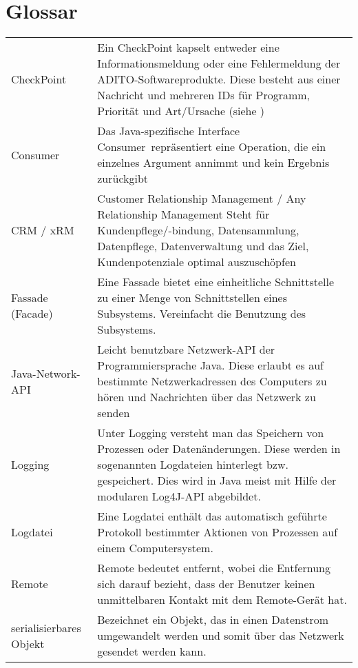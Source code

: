 \section{Glossar}
\begin{center}
	\begin{tabularx}{\textwidth}{p{}|X}
	    CheckPoint  & Ein CheckPoint kapselt entweder eine Informationsmeldung oder eine Fehlermeldung der ADITO-Softwareprodukte. Diese besteht aus einer Nachricht und mehreren IDs für Programm, Priorität und Art/Ursache (siehe \prettyref{sec:IRemoteLoggerCommand}) \\

   	  	Consumer  & Das Java-spezifische Interface \glqq Consumer\grqq\ repräsentiert eine Operation, die ein einzelnes Argument annimmt und kein Ergebnis zurückgibt \\

	    CRM / xRM & 
		Customer Relationship Management / Any Relationship Management
	  	Steht für Kundenpflege/-bindung, Datensammlung, Datenpflege, Datenverwaltung und das Ziel, Kundenpotenziale optimal auszuschöpfen \\ 
	  	
	  	Fassade (Facade) & Eine Fassade bietet eine einheitliche Schnittstelle zu einer Menge von Schnittstellen eines Subsystems. Vereinfacht die Benutzung des Subsystems.\\
	  	
	  	Java-Network-API & Leicht benutzbare Netzwerk-API der Programmiersprache Java. Diese erlaubt es auf bestimmte Netzwerkadressen des Computers zu hören und Nachrichten über das Netzwerk zu senden \\
	  	
	  	Logging & Unter Logging versteht man das Speichern von Prozessen oder Datenänderungen. Diese werden in sogenannten Logdateien hinterlegt bzw. gespeichert. Dies wird in Java meist mit Hilfe der modularen Log4J-API abgebildet.\\
	  	
	  	Logdatei  & Eine Logdatei enthält das automatisch geführte Protokoll bestimmter Aktionen von Prozessen auf einem Computersystem. \\
	  	
	  	Remote & Remote bedeutet entfernt, wobei die Entfernung sich darauf bezieht, dass der Benutzer keinen unmittelbaren Kontakt mit dem Remote-Gerät hat.\\
	  	
	  	serialisierbares Objekt  & Bezeichnet ein Objekt, das in einen Datenstrom umgewandelt werden und somit über das Netzwerk gesendet werden kann. \\

	\end{tabularx}
\end{center}